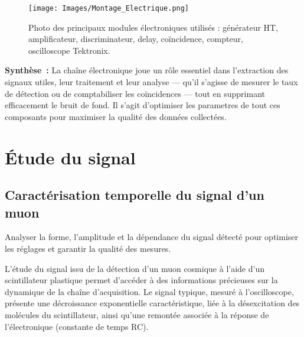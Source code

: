 \documentclass[a4paper,12pt,twoside]{article}
\begin{document}
\begin{figure}[H]
  \centering
  \texttt{[image: Images/Montage\_Electrique.png]}
  \caption{Photo des principaux modules électroniques utilisés : générateur HT, amplificateur, discriminateur, delay, coïncidence, compteur, oscilloscope Tektronix.}
  \label{fig:photo_instruments}
\end{figure}

\begin{remarque}
\textbf{Synthèse~:} La chaîne électronique joue un rôle essentiel dans l’extraction des signaux utiles, leur traitement et leur analyse — qu’il s’agisse de mesurer le taux de détection ou de comptabiliser les coïncidences — tout en supprimant efficacement le bruit de fond. Il s'agit d'optimiser les parametres de tout ces composants pour maximiser la qualité des données collectées.
\end{remarque}


\section{Étude du signal}
\subsection{Caractérisation temporelle du signal d’un muon}



\begin{center}
\begin{tcolorbox}[colback=blue!5!white, colframe=blue!60!black, title=Principe de l’étude du signal]
Analyser la forme, l’amplitude et la dépendance du signal détecté pour optimiser les réglages et garantir la qualité des mesures.
\end{tcolorbox}
\end{center}


L’étude du signal issu de la détection d’un muon cosmique à l’aide d’un scintillateur plastique permet d’accéder à des informations précieuses sur la dynamique de la chaîne d’acquisition. Le signal typique, mesuré à l’oscilloscope, présente une décroissance exponentielle caractéristique, liée à la désexcitation des molécules du scintillateur, ainsi qu’une remontée associée à la réponse de l’électronique (constante de temps RC).
\end{document}
